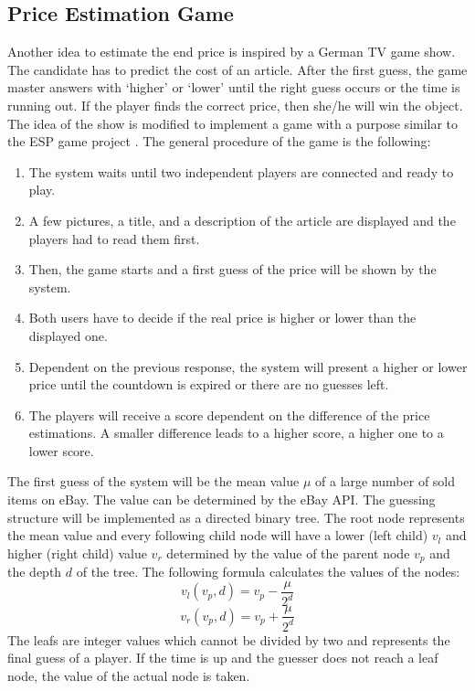 \subsection{Price Estimation Game}
Another idea to estimate the end price is inspired by a German TV game show. The candidate has to predict the cost of an article. After the first guess, the game master answers with `higher' or `lower' until the right guess occurs or the time is running out. If the player finds the correct price, then she/he will win the object.
The idea of the show is modified to implement a game with a purpose similar to the ESP game project \cite{esp}. The general procedure of the game is the following: 
\begin{enumerate}
	\item The system waits until two independent players are connected and ready to play. 
	\item A few pictures, a title, and a description of the article are displayed and the players had to read them first. 
	\item Then, the game starts and a first guess of the price will be shown by the system. 
	\item Both users have to decide if the real price is higher or lower than the displayed one. 
	\item Dependent on the previous response, the system will present a higher or lower price until the countdown is expired or there are no guesses left. 
	\item The players will receive a score dependent on the difference of the price estimations. A smaller difference leads to a higher score, a higher one to a lower score. 
\end{enumerate}
The first guess of the system will be the mean value \( \mu \) of a large number of sold items on eBay. The value can be determined by the eBay API. The guessing structure will be implemented as a directed binary tree. The root node represents the mean value and every following child node will have a lower (left child) \( v_l \) and higher (right child) value \( v_r \) determined by the value of the parent node \( v_p \) and the depth \( d \) of the tree. The following formula calculates the values of the nodes: 
\begin{equation}
v_l(v_p,d) = v_p - \frac{\mu}{2^d}
\end{equation}
\begin{equation}
v_r(v_p,d) = v_p + \frac{\mu}{2^d}
\end{equation}
The leafs are integer values which cannot be divided by two and represents the final guess of a player. If the time is up and the guesser does not reach a leaf node, the value of the actual node is taken. 
